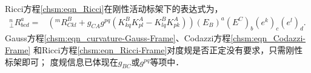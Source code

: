 Ricci方程\eqref{chsm:eqn_Ricci}在刚性活动标架下的表达式为，
\begin{equation}\label{chsm:eqn_Ricci-Frame}
    \begin{aligned}
        {}^{n}_{\bot}{R}^a_{bcd}
        =& \left({}^{m}{R}^B_{C kl} + g_{CA} g^{pq} (K^B_{kq}K^A_{pl}
        - K^B_{lq} K^A_{pk}) \right) (E_B)^a (E^C)_b (e^k)_c (e^l)_d .
    \end{aligned}
\end{equation}  %
Gauss方程\eqref{chsm:eqn_curvature-Gauss-Frame}、Codazzi方程\eqref{chsm:eqn_Codazzi-Frame}
和Ricci方程\eqref{chsm:eqn_Ricci-Frame}对度规是否正定没有要求，只需刚性标架即可；
度规信息已体现在$g_{BC}$或$g^{pq}$等项中．






